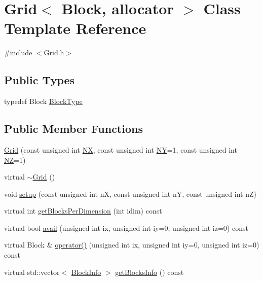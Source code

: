 \hypertarget{class_grid}{}\section{Grid$<$ Block, allocator $>$ Class Template Reference}
\label{class_grid}


{\ttfamily \#include $<$Grid.\+h$>$}

\subsection*{Public Types}
\begin{DoxyCompactItemize}
\item 
typedef Block \hyperlink{class_grid_a455d62a62799b947e799a28315700b9e}{Block\+Type}
\end{DoxyCompactItemize}
\subsection*{Public Member Functions}
\begin{DoxyCompactItemize}
\item 
\hyperlink{class_grid_a31f48dede8dce2a6fb4260e42c991ec9}{Grid} (const unsigned int \hyperlink{class_grid_a5253120e941ec878f57dd17d5f54cadd}{N\+X}, const unsigned int \hyperlink{class_grid_a8956891d20426acabca4252ec7e299bc}{N\+Y}=1, const unsigned int \hyperlink{class_grid_ad6632ff47c714e008ba88a89b4c1684b}{N\+Z}=1)
\item 
virtual \hyperlink{class_grid_a64f8123459bcfe7c6f2aac0e21a93458}{$\sim$\+Grid} ()
\item 
void \hyperlink{class_grid_a754c47a84c734075e6ccffacb0b4509d}{setup} (const unsigned int n\+X, const unsigned int n\+Y, const unsigned int n\+Z)
\item 
virtual int \hyperlink{class_grid_a68154c3137ad02f44a24d2d75d807fe6}{get\+Blocks\+Per\+Dimension} (int idim) const 
\item 
virtual bool \hyperlink{class_grid_ae2014bfbb3953437effb08202e7cd482}{avail} (unsigned int ix, unsigned int iy=0, unsigned int iz=0) const 
\item 
virtual Block \& \hyperlink{class_grid_a04a6717ea6f8eb51607eaeaba2127055}{operator()} (unsigned int ix, unsigned int iy=0, unsigned int iz=0) const 
\item 
virtual std\+::vector$<$ \hyperlink{struct_block_info}{Block\+Info} $>$ \hyperlink{class_grid_a39aa8cb7fad1abcfe40fdd77d9b72d8a}{get\+Blocks\+Info} () const 
\end{DoxyCompactItemize}
